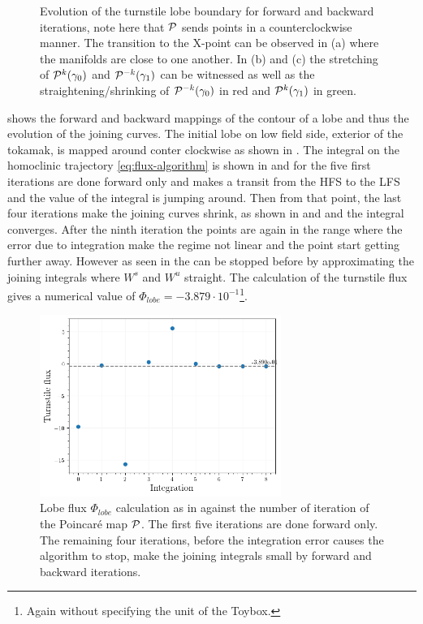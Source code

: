 \begin{figure}[H]
\begin{minipage}[c]{0.42\textwidth}
\begin{subfigure}[b]{0.95\textwidth}
        \end{subfigure}
    \end{minipage}%
    \caption{Evolution of the turnstile lobe boundary for forward and backward iterations, note here that $\mathcal{P}$ sends points in a counterclockwise manner. The transition to the X-point can be observed in (a) where the manifolds are close to one another. In (b) and (c) the stretching of $\mathcal{P}^k(\gamma_0)$ and $\mathcal{P}^{-k}(\gamma_1)$ can be witnessed as well as the straightening/shrinking of $\mathcal{P}^{-k}(\gamma_0)$ in red and $\mathcal{P}^{k}(\gamma_1)$ in green.}
    \label{fig:flux-poincare-conv}
\end{figure}

 shows the forward and backward mappings of the contour of a lobe and thus the evolution of the joining curves. The initial lobe on low field side, exterior of the tokamak, is mapped around conter clockwise as shown in . The integral on the homoclinic trajectory \eqref{eq:flux-algorithm} is shown in  and for the five first iterations are done forward only and makes a transit from the HFS to the LFS and the value of the integral is jumping around. Then from that point, the last four iterations make the joining curves shrink, as shown in  and  and the integral converges. After the ninth iteration the points are again in the range where the error due to integration make the regime not linear and the point start getting further away. However as seen in  the can be stopped before by approximating the joining integrals where $W^s$ and $W^u$ straight. The calculation of the turnstile flux gives a numerical value of $\Phi_{lobe} = -3.879\cdot 10^{-1}$\footnote{Again without specifying the unit of the Toybox.}.

\begin{figure}[H]
    \centering
    \includegraphics[width=0.7\textwidth]{images/turnstile/turnstile_area_final.png}
    \caption{Lobe flux $\Phi_{lobe}$ calculation as in  against the number of iteration of the Poincaré map $\mathcal{P}$. The first five iterations are done forward only. The remaining four iterations, before the integration error causes the algorithm to stop, make the joining integrals small by forward and backward iterations.}
    \label{fig:turnstile-convergence}
\end{figure}

